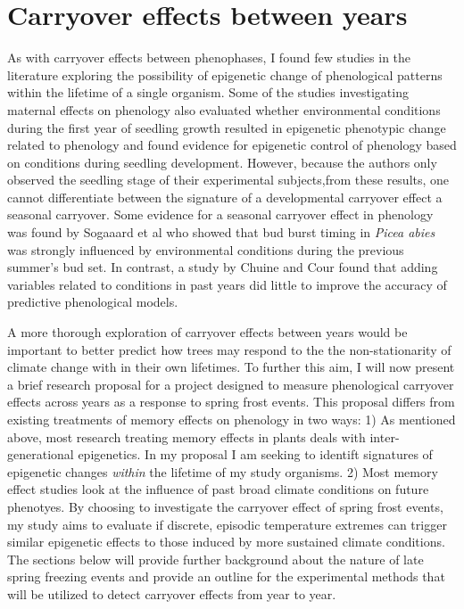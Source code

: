 \documentclass{article}\usepackage[]{graphicx}\usepackage[]{color}
\begin{document}
\section{Carryover effects between years}
\par As with carryover effects between phenophases, I found few studies in the literature exploring the possibility of epigenetic change of phenological patterns within the lifetime of a single organism.
Some of the studies investigating maternal effects on phenology also evaluated whether environmental conditions during the first year of seedling growth resulted in epigenetic phenotypic change related to phenology \citep{Gomery2015} and found evidence for epigenetic control of phenology based on conditions during seedling development. However, because the authors only observed the seedling stage of their experimental subjects,from these results, one cannot differentiate between the signature of a developmental carryover effect a seasonal carryover. Some evidence for a seasonal carryover effect in phenology was found by Sogaaard et al \citeyear{Sogaard2008} who showed that  bud burst timing in \textit{Picea abies} was strongly influenced by environmental conditions during the previous summer's bud set. In contrast, a study by Chuine and Cour \citeyear{Chuine1999} found that adding variables related to conditions in past years did little to improve the accuracy of predictive phenological models.
\par A more thorough exploration of carryover effects between years would be important to better predict how trees may respond to the the non-stationarity of climate change with in their own lifetimes. To further this aim, I will now present a brief research proposal for a project designed to measure phenological carryover effects across years as a response to spring frost events. This proposal differs from existing treatments of memory effects on phenology in two ways:
1) As mentioned above, most research treating memory effects in plants deals with inter-generational epigenetics. In my proposal I am seeking to identift signatures of epigenetic changes \textit{within} the lifetime of my study organisms.
2) Most memory effect studies look at the influence of past broad climate conditions on future phenotyes. By choosing to investigate the carryover effect of spring frost events, my study aims to evaluate if discrete, episodic temperature extremes can trigger similar epigenetic effects to those induced by more sustained climate conditions. The sections below will provide further background about the nature of late spring freezing events and provide an outline for the experimental methods that will be utilized to detect carryover effects from year to year.
\end{document}
